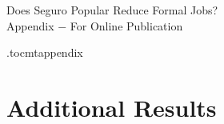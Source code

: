 
\setcounter{table}{0}
\setcounter{figure}{0}
\setcounter{section}{0}

\begin{center}
	\LARGE Does Seguro Popular Reduce Formal Jobs?  \\[0.5em]
	\Large{Appendix $-$ For Online Publication} \\[1em]
	\large \author{Enrique Seira  \and Isaac Meza  \and Eduardo González-Pier \and Eduardo Alcaraz}
\end{center}

\appendix
{}
\renewcommand\thefigure{OA-\arabic{figure}}
\renewcommand\thetable{OA-\arabic{table}}
\renewcommand*{\thepage}{OA - \arabic{page}}
\renewcommand\thesection{Appendix \Alph{section}.}
\renewcommand\thesubsection{\Alph{section}.\arabic{subsection}}

\renewcommand\cftsecdotsep{\cftdotsep}
\renewcommand\cftsubsecdotsep{\cftnodots}
\renewcommand{\cftsecnumwidth}{6em}
 \renewcommand{\cftpnumalign}{r}


\renewcommand{\cftsecleader}{\cftdotfill{\cftsecdotsep}\hspace{1.8em}}

\etocdepthtag.toc{mtappendix}


\begingroup
\let\clearpage\relax
\tableofcontents
\endgroup


\newpage

\vspace{.2in}

\section{Additional Results}


